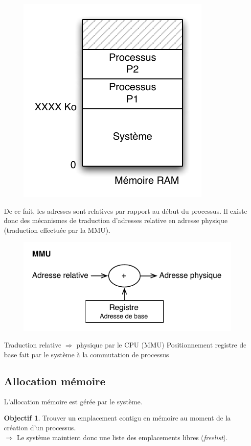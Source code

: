 \documentclass[11pt,english,french]{scrreprt}
\theoremstyle{remark}
\theoremstyle{definition}
\newtheorem*{obj*}{Objectif}
\begin{document}
\begin{figure}[h!]
	\center
	\vspace{-10pt}
	\includegraphics[scale=.85]{img/mem-multi-prg}
\end{figure} 

De ce fait, les adresses sont relatives par rapport au début du processus. Il existe donc des mécanismes de traduction d'adresses relative en adresse physique (traduction effectuée par la MMU).
\begin{figure}[h!]
	\center
	\vspace{-10pt}
	\includegraphics[scale=.85]{img/MMU}
\end{figure}

Traduction relative $\Rightarrow$ physique par le CPU (MMU)
Positionnement registre de base fait par le système à la commutation de processus

\subsection{Allocation mémoire}
L'allocation mémoire est gérée par le système.
\begin{obj*}
 	Trouver un emplacement contigu en mémoire au moment de la création d'un processus.\\
	$\Rightarrow$ Le système maintient donc une liste des emplacements libres (\emph{freelist}).
\end{obj*} 
\end{document}

